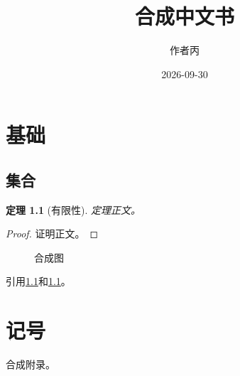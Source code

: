 \documentclass[fontset=fandol]{ctexbook}
\title{合成中文书}
\author{作者丙}
\date{2026-09-30}
\newtheorem{theorem}{定理}[chapter]
\begin{document}
\maketitle
\tableofcontents
\chapter{基础}\label{ch:intro}
\section{集合}\label{sec:sets}
\begin{theorem}[有限性]\label{thm:one}
定理正文。
\end{theorem}
\begin{proof}证明正文。\end{proof}
\begin{figure}\centering\caption{合成图}\label{fig:one}\end{figure}
引用\ref{thm:one}和\ref{fig:one}。
\appendix
\chapter{记号}\label{ch:appendix}
合成附录。
\end{document}
